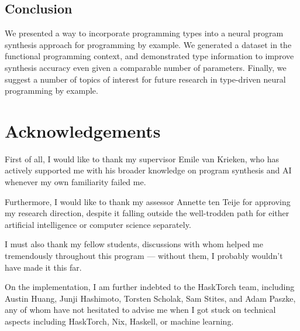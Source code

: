 \documentclass{article}
\begin{document}


\subsection{Conclusion}

We presented a way to incorporate programming types into a neural program synthesis approach for programming by example.
We generated a dataset in the functional programming context,
and demonstrated type information to improve synthesis accuracy even given a comparable number of parameters.
Finally, we suggest a number of topics of interest for future research in type-driven neural programming by example.


\pagebreak

\section{Acknowledgements} %

First of all, I would like to thank my supervisor Emile van Krieken,
who has actively supported me with his broader knowledge on
program synthesis and AI whenever my own familiarity failed me.

Furthermore, I would like to thank my assessor Annette ten Teije for approving
my research direction, despite it falling outside the well-trodden
path for either artificial intelligence or computer science separately.

I must also thank my fellow students, discussions with whom helped me
tremendously throughout this program --- without them,
I probably wouldn't have made it this far.

On the implementation, I am further indebted to the HaskTorch team,
including Austin Huang, Junji Hashimoto, Torsten Scholak, Sam Stites, and Adam Paszke,
any of whom have not hesitated to advise me when I got stuck
on technical aspects including HaskTorch, Nix, Haskell, or machine learning.
\end{document}
